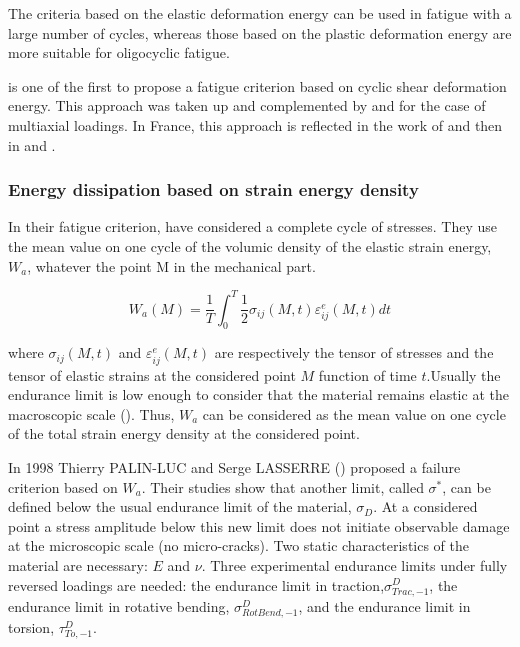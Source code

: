 The criteria based on the elastic deformation energy can be used in fatigue with a large number of cycles, whereas those based on the plastic deformation energy are more suitable for oligocyclic fatigue.

\cite{ellyin1974criterion} is one of the first to propose a fatigue criterion based on cyclic shear deformation energy. This approach was taken up and complemented by \cite{lefebvre1981cognitive} and \cite{ellyin1991phase} for the case of multiaxial loadings. In France, this approach is reflected in the work of \cite{Froustey1992} and then in \cite{palin1996fatigue} and \cite{banvillet2001prevision}.

\subsubsection{Energy dissipation based on strain energy density}

In their fatigue criterion, \cite{Froustey1992}  have considered a complete cycle of
stresses. They use the mean value on one cycle of
the volumic density of the elastic strain energy, $W_a$, whatever the point
M in the mechanical part.

$$W_a(M)=\frac{1}{T}\int_{0}^{T}\frac{1}{2}\sigma_{ij}(M,t)\varepsilon_{ij}^e(M,t)dt$$

where $\sigma_{ij}(M,t)$ and $\varepsilon_{ij}^e(M,t)$ are respectively the tensor of stresses and the tensor of
elastic strains at the considered point $M$ function of time $t$.Usually the endurance limit
is low enough to consider that the material remains elastic at the macroscopic scale
(\cite{chaboche1988non}). Thus, $W_a$ can be considered as the mean value on one
cycle of the total strain energy density at the considered point.

In 1998 Thierry PALIN-LUC and Serge LASSERRE (\cite{palin1998energy}) proposed a failure criterion based on $W_a$. Their studies show that another limit, called $\sigma^*$, can be defined below
the usual endurance limit of the material, $\sigma_D$. At a considered point a stress amplitude
below this new limit does not initiate observable damage at the microscopic scale (no
micro-cracks). Two static characteristics of the material are necessary: $E$ and $\nu$. Three
experimental endurance limits under fully reversed loadings are needed: the endurance
limit in traction,$\sigma_{Trac,-1}^D$, the endurance limit in rotative bending, $\sigma_{RotBend,-1}^D$, and the
endurance limit in torsion, $\tau_{To,-1}^D$. 

